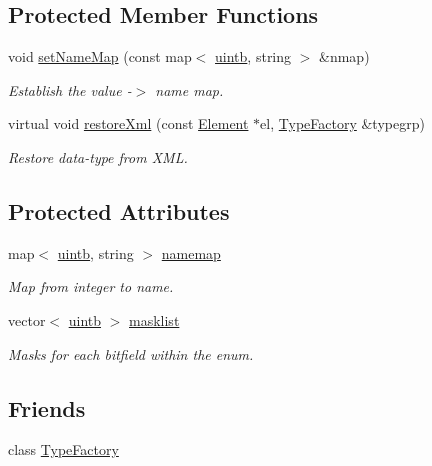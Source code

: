 \subsection*{Protected Member Functions}
\begin{DoxyCompactItemize}
\item 
void \mbox{\hyperlink{class_type_enum_a888839555ff7b768f371e794a979a8dc}{set\+Name\+Map}} (const map$<$ \mbox{\hyperlink{types_8h_a2db313c5d32a12b01d26ac9b3bca178f}{uintb}}, string $>$ \&nmap)
\begin{DoxyCompactList}\small\item\em Establish the value -\/$>$ name map. \end{DoxyCompactList}\item 
virtual void \mbox{\hyperlink{class_type_enum_a1bd4dc88f4ea0b58b4b164b4b5f4f5e5}{restore\+Xml}} (const \mbox{\hyperlink{class_element}{Element}} $\ast$el, \mbox{\hyperlink{class_type_factory}{Type\+Factory}} \&typegrp)
\begin{DoxyCompactList}\small\item\em Restore data-\/type from X\+ML. \end{DoxyCompactList}\end{DoxyCompactItemize}
\subsection*{Protected Attributes}
\begin{DoxyCompactItemize}
\item 
map$<$ \mbox{\hyperlink{types_8h_a2db313c5d32a12b01d26ac9b3bca178f}{uintb}}, string $>$ \mbox{\hyperlink{class_type_enum_af66c4e826f409305dd0114399b9dcdf2}{namemap}}
\begin{DoxyCompactList}\small\item\em Map from integer to name. \end{DoxyCompactList}\item 
vector$<$ \mbox{\hyperlink{types_8h_a2db313c5d32a12b01d26ac9b3bca178f}{uintb}} $>$ \mbox{\hyperlink{class_type_enum_aeca741a62b9437eeff15ef7daa2a6bea}{masklist}}
\begin{DoxyCompactList}\small\item\em Masks for each bitfield within the enum. \end{DoxyCompactList}\end{DoxyCompactItemize}
\subsection*{Friends}
\begin{DoxyCompactItemize}
\item 
class \mbox{\hyperlink{class_type_enum_ac8c1945d0a63785e78b3e09a13226ed6}{Type\+Factory}}
\end{DoxyCompactItemize}
